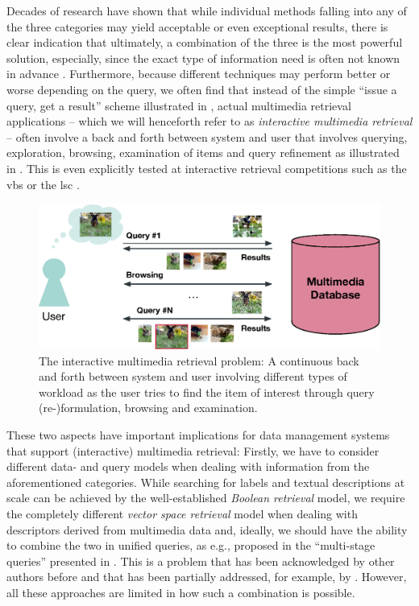 Decades of research have shown that while individual methods falling into any of the three categories may yield acceptable or even exceptional results, there is clear indication that ultimately, a combination of the three is the most powerful solution, especially, since the exact type of information need is often not known in advance \cite{Rossetto:2020Interactive} . Furthermore, because different techniques may perform better or worse depending on the query, we often find that instead of the simple ``issue a query, get a result'' scheme illustrated in , actual multimedia retrieval applications -- which we will henceforth refer to as \emph{interactive multimedia retrieval} -- often involve a back and forth between system and user that involves querying, exploration, browsing, examination of items and query refinement \cite{Lokovc:2019Interactive,Gurrin:2019Invited} as illustrated in . This is even explicitly tested at interactive retrieval competitions such as the \acrfull{vbs} \cite{Schoeffmann:2019Video} or the \acrfull{lsc} \cite{Gurrin:2021Introduction}.

\begin{figure}[tb]
    \centering
    \includegraphics[width=\textwidth]{figures/mr-actual.eps}
    \caption{The interactive multimedia retrieval problem: A continuous back and forth between system and user involving different types of workload as the user tries to find the item of interest through query (re-)formulation, browsing and examination.}
    \label{figure:mr-actual}
\end{figure}
 
These two aspects have important implications for data management systems that support (interactive) multimedia retrieval: Firstly, we have to consider different data- and query models when dealing with information from the aforementioned categories. While searching for labels and textual descriptions at scale can be achieved by the well-established \emph{Boolean retrieval} model, we require the completely different \emph{vector space retrieval} model when dealing with descriptors derived from multimedia data and, ideally, we should have the ability to combine the two in unified queries, as e.g., proposed in the ``multi-stage queries'' presented in \cite{Heller:2020Multi}. This is a problem that has been acknowledged by other authors before \cite{Jonson:2016} and that has been partially addressed, for example, by \cite{Giangreco:2018Database,Giangreco:2016adam,Wang:2021Milvus}. However, all these approaches are limited in how such a combination is possible.

